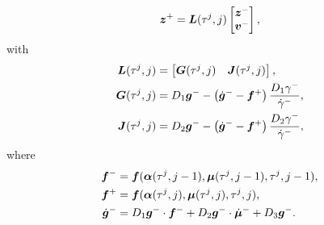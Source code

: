 \documentclass[../DC2017114Bouma.tex]{subfiles}
\begin{document}
\begin{align}
\zb^+ = \Lb(\tau^j,j)\begin{bmatrix}
\zb^- \\ \vb^-
\end{bmatrix},
\end{align}
with 
\begin{align}
\Lb(\tau^j,j) &= \begin{bmatrix}
\Gb(\tau^j,j) & \Jb(\tau^j,j)
\end{bmatrix},\\
\Gb(\tau^j,j) & = D_1\gb^- - \left(\dot{\gb}^- - \fb^+\right)\frac{D_1\gamma^-}{\dot{\gamma}^-},\\
\Jb(\tau^j,j) & = D_2\gb^- - \left(\dot{\gb}^- - \fb^+\right)\frac{D_2\gamma^-}{\dot{\gamma}^-},
\end{align}
where
\begin{align}
\fb^- &= \fb(\alphab(\tau^j,j-1),\mub(\tau^j,j-1),\tau^j,j-1),\\
\fb^+ &= \fb(\alphab(\tau^j,j),\mub(\tau^j,j),\tau^j,j),\\
\dot{\gb}^- &= D_1\gb^-\cdot \fb^- + D_2\gb^-\cdot \dot{\mub}^- + D_3\gb^-.
\end{align}
\end{document}
